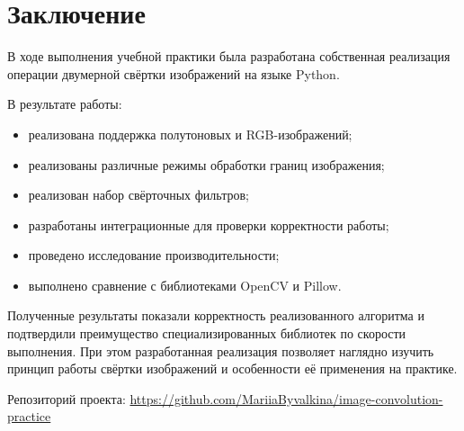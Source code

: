 \documentclass[a4paper]{article}
\begin{document}
\section{Заключение}

В ходе выполнения учебной практики была разработана собственная реализация операции двумерной свёртки изображений на языке Python.

В результате работы:
\begin{itemize}
    \item реализована поддержка полутоновых и RGB-изображений;
    \item реализованы различные режимы обработки границ изображения;
    \item реализован набор свёрточных фильтров;
    \item разработаны интеграционные для проверки корректности работы;
    \item проведено исследование производительности;
    \item выполнено сравнение с библиотеками OpenCV и Pillow.
\end{itemize}

Полученные результаты показали корректность реализованного алгоритма и подтвердили преимущество специализированных библиотек по скорости выполнения. При этом разработанная реализация позволяет наглядно изучить принцип работы свёртки изображений и особенности её применения на практике.

Репозиторий проекта: \url{https://github.com/MariiaByvalkina/image-convolution-practice}
\end{document}
